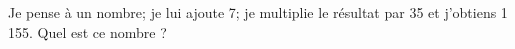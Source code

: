 Je pense à un nombre; je lui ajoute 7; je multiplie le résultat par 35
et j'obtiens 1\,155. Quel est ce nombre ?